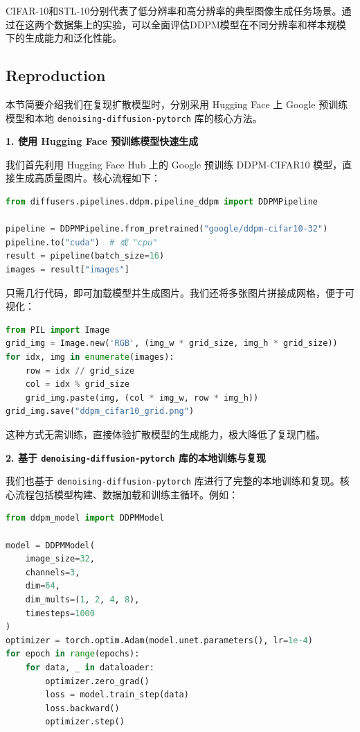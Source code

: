 \documentclass{ctexart}
\begin{document}
\noindent
CIFAR-10和STL-10分别代表了低分辨率和高分辨率的典型图像生成任务场景。通过在这两个数据集上的实验，可以全面评估DDPM模型在不同分辨率和样本规模下的生成能力和泛化性能。

\subsection{Reproduction}
\noindent
本节简要介绍我们在复现扩散模型时，分别采用 Hugging Face 上 Google 预训练模型和本地 \texttt{denoising-diffusion-pytorch} 库的核心方法。

\vspace{0.5em}
\noindent
\textbf{1. 使用 Hugging Face 预训练模型快速生成}

\noindent
我们首先利用 Hugging Face Hub 上的 Google 预训练 DDPM-CIFAR10 模型，直接生成高质量图片。核心流程如下：

\begin{lstlisting}[language=python, caption=使用 Hugging Face 预训练模型]
from diffusers.pipelines.ddpm.pipeline_ddpm import DDPMPipeline

pipeline = DDPMPipeline.from_pretrained("google/ddpm-cifar10-32")
pipeline.to("cuda")  # 或 "cpu"
result = pipeline(batch_size=16)
images = result["images"]
\end{lstlisting}

\noindent
只需几行代码，即可加载模型并生成图片。我们还将多张图片拼接成网格，便于可视化：

\begin{lstlisting}[language=python, caption=图像拼接与保存]
from PIL import Image
grid_img = Image.new('RGB', (img_w * grid_size, img_h * grid_size))
for idx, img in enumerate(images):
    row = idx // grid_size
    col = idx % grid_size
    grid_img.paste(img, (col * img_w, row * img_h))
grid_img.save("ddpm_cifar10_grid.png")
\end{lstlisting}

\noindent
这种方式无需训练，直接体验扩散模型的生成能力，极大降低了复现门槛。

\vspace{0.5em}
\noindent
\textbf{2. 基于 \texttt{denoising-diffusion-pytorch} 库的本地训练与复现}

\noindent
我们也基于 \texttt{denoising-diffusion-pytorch} 库进行了完整的本地训练和复现。核心流程包括模型构建、数据加载和训练主循环。例如：

\begin{lstlisting}[language=python]
from ddpm_model import DDPMModel

model = DDPMModel(
    image_size=32,
    channels=3,
    dim=64,
    dim_mults=(1, 2, 4, 8),
    timesteps=1000
)
optimizer = torch.optim.Adam(model.unet.parameters(), lr=1e-4)
for epoch in range(epochs):
    for data, _ in dataloader:
        optimizer.zero_grad()
        loss = model.train_step(data)
        loss.backward()
        optimizer.step()
\end{lstlisting}
\end{document}
